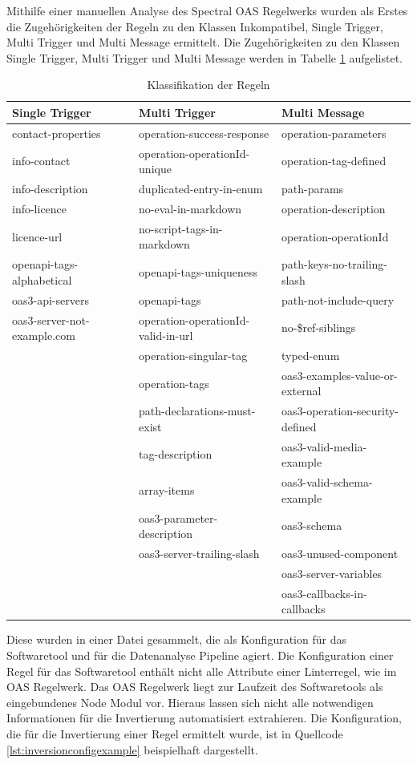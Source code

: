 Mithilfe einer manuellen Analyse des Spectral \acs{OAS} Regelwerks wurden als Erstes die Zugehörigkeiten der Regeln zu den Klassen Inkompatibel, Single Trigger, Multi Trigger und Multi Message ermittelt. Die Zugehörigkeiten zu den Klassen Single Trigger, Multi Trigger und Multi Message werden in Tabelle \ref{tab:ruleclasses} aufgelistet.
{\footnotesize
\begin{longtable}{lll}
  \caption{\normalsize Klassifikation der Regeln}
  \label{tab:ruleclasses}
  \endfirsthead
  \endhead
  \textbf{Single Trigger} & \textbf{Multi Trigger} & \textbf{Multi Message}\\
  \hline\hline
  contact-properties & operation-success-response & operation-parameters\\
  info-contact & operation-operationId-unique & operation-tag-defined\\
  info-description & duplicated-entry-in-enum & path-params\\
  info-licence & no-eval-in-markdown & operation-description\\
  licence-url & no-script-tags-in-markdown & operation-operationId\\
  openapi-tags-alphabetical & openapi-tags-uniqueness & path-keys-no-trailing-slash\\
  oas3-api-servers & openapi-tags & path-not-include-query\\
  oas3-server-not-example.com & operation-operationId-valid-in-url & no-\$ref-siblings\\
  & operation-singular-tag & typed-enum\\
  & operation-tags & oas3-examples-value-or-external\\
  & path-declarations-must-exist & oas3-operation-security-defined\\
  & tag-description & oas3-valid-media-example\\
  & array-items & oas3-valid-schema-example\\
  & oas3-parameter-description & oas3-schema\\
  & oas3-server-trailing-slash & oas3-unused-component\\
  && oas3-server-variables\\
  && oas3-callbacks-in-callbacks\\
  \hline\hline
\end{longtable}
}

Diese wurden in einer Datei gesammelt, die als Konfiguration für das Softwaretool und für die Datenanalyse Pipeline agiert. Die Konfiguration einer Regel für das Softwaretool enthält nicht alle Attribute einer Linterregel, wie im \acs{OAS} Regelwerk. Das \acs{OAS} Regelwerk liegt zur Laufzeit des Softwaretools als eingebundenes Node Modul vor. Hieraus lassen sich nicht alle notwendigen Informationen für die Invertierung automatisiert extrahieren. Die Konfiguration, die für die Invertierung einer Regel ermittelt wurde, ist in Quellcode \ref{lst:inversionconfigexample} beispielhaft dargestellt.

